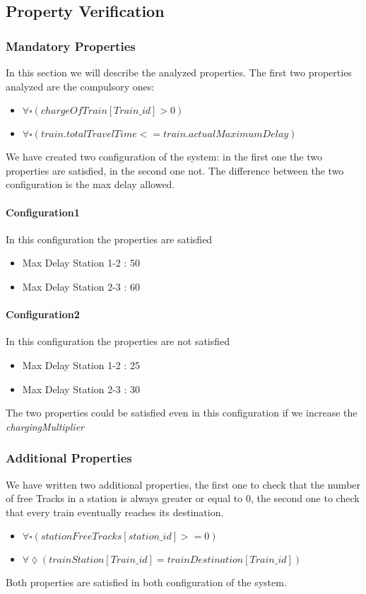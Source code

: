 \subsection{Property Verification}
\subsubsection{Mandatory Properties}
In this section we will describe the analyzed properties. The first two properties analyzed are the compulsory ones:
\begin{itemize}
    \item $\forall  \square(chargeOfTrain[Train\_id] > 0) $
    \item $\forall \square(train.totalTravelTime <= train.actualMaximumDelay) $
\end{itemize}

We have created two configuration of the system: in the first one the two properties are satisfied, in the second one not.
The difference between the two configuration is the max delay allowed.

\paragraph{Configuration1} In this configuration the properties are satisfied \begin{itemize}
    \item Max Delay Station 1-2 : 50
    \item Max Delay Station 2-3 : 60
\end{itemize}



\paragraph{Configuration2}
In this configuration the properties are not satisfied \begin{itemize}
    \item Max Delay Station 1-2 : 25
    \item Max Delay Station 2-3 : 30
\end{itemize} The two properties could be satisfied even in this configuration if we increase the \textit{chargingMultiplier}


\subsubsection{Additional Properties}
We have written two additional properties, the first one to check that the number of free Tracks in a station is always greater or equal to 0,
the second one to check that every train eventually reaches its destination.
\begin{itemize}
    \item $\forall  \square(stationFreeTracks[station\_id] >=  0) $
    \item $\forall  \lozenge(trainStation[Train\_id] = trainDestination[Train\_id]) $
\end{itemize}
Both properties are satisfied in both configuration of the system.
